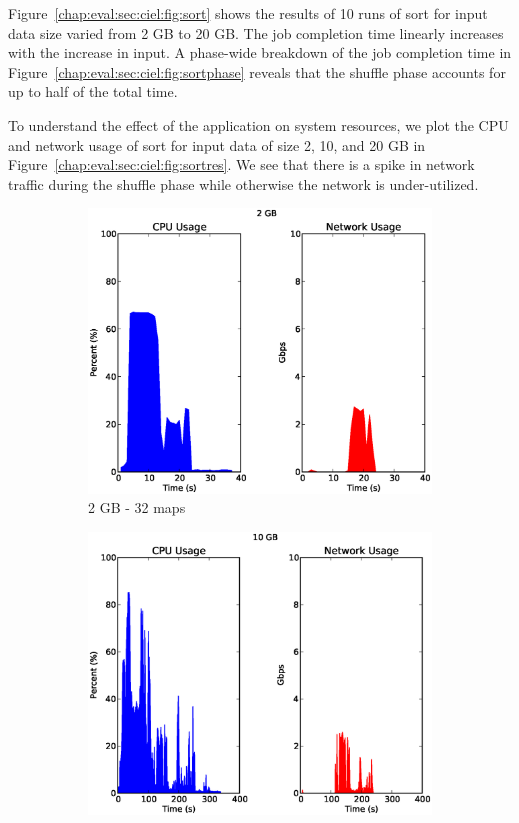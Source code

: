 \documentclass[a4paper,12pt,twoside,openright]{report}
\begin{document}
Figure~\ref{chap:eval:sec:ciel:fig:sort} shows the results of 10 runs of sort
for input data size varied from 2 GB to 20 GB. The job completion time linearly
increases with the increase in input. A phase-wide breakdown of the job
completion time in Figure~\ref{chap:eval:sec:ciel:fig:sortphase} reveals that
the shuffle phase accounts for up to half of the total time.

To understand the effect of the application on system resources, we plot the CPU
and network usage of sort for input data of size 2, 10, and 20 GB in
Figure~\ref{chap:eval:sec:ciel:fig:sortres}. We see that there is a spike in
network traffic during the shuffle phase while otherwise the network is
under-utilized.

\begin{figure}[h!]
        \begin{subfigure}[b]{0.33\textwidth}
                \centering
                \includegraphics[width=\textwidth]{32maps.csv.eps}
                \caption{2 GB - 32 maps}
                \label{fig:2GBsortres}
        \end{subfigure}%
        \begin{subfigure}[b]{0.33\textwidth}
                \centering
                \includegraphics[width=\textwidth]{160maps.csv.eps}

\end{subfigure}
\end{figure}
\end{document}
